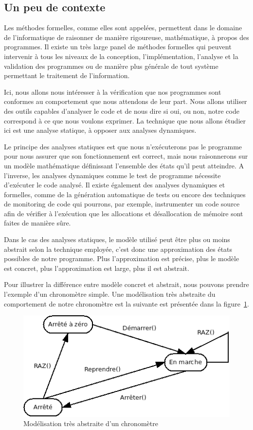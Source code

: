 \documentclass[12pt,francais,]{scrbook}
\begin{document}
\subsection{Un peu de contexte}\label{un-peu-de-contexte}

Les méthodes formelles, comme elles sont appelées, permettent dans le
domaine de l'informatique de raisonner de manière rigoureuse,
mathématique, à propos des programmes. Il existe un très large panel de
méthodes formelles qui peuvent intervenir à tous les niveaux de la
conception, l'implémentation, l'analyse et la validation des programmes
ou de manière plus générale de tout système permettant le traitement de
l'information.

Ici, nous allons nous intéresser à la vérification que nos programmes
sont conformes au comportement que nous attendons de leur part. Nous
allons utiliser des outils capables d'analyser le code et de nous dire
si oui, ou non, notre code correspond à ce que nous voulons exprimer. La
technique que nous allons étudier ici est une analyse statique, à
opposer aux analyses dynamiques.

Le principe des analyses statiques est que nous n'exécuterons pas le
programme pour nous assurer que son fonctionnement est correct, mais
nous raisonnerons sur un modèle mathématique définissant l'ensemble des
états qu'il peut atteindre. A l'inverse, les analyses dynamiques comme
le test de programme nécessite d'exécuter le code analysé. Il existe
également des analyses dynamiques et formelles, comme de la génération
automatique de tests ou encore des techniques de monitoring de code qui
pourrons, par exemple, instrumenter un code source afin de vérifier à
l'exécution que les allocations et désallocation de mémoire sont faites
de manière sûre.

Dans le cas des analyses statiques, le modèle utilisé peut être plus ou
moins abstrait selon la technique employée, c'est donc une approximation
des états possibles de notre programme. Plus l'approximation est
précise, plus le modèle est concret, plus l'approximation est large,
plus il est abstrait.

Pour illustrer la différence entre modèle concret et abstrait, nous
pouvons prendre l'exemple d'un chronomètre simple. Une modélisation très
abstraite du comportement de notre chronomètre est la suivante est
présentée dans la figure~\ref{fig:1-1-chrono}.

\begin{figure}[htbp]
\centering
\includegraphics[scale=0.5]{1-1-model.png}
\caption{Modélisation très abstraite d'un chronomètre}
\label{fig:1-1-chrono}
\end{figure}
\end{document}
